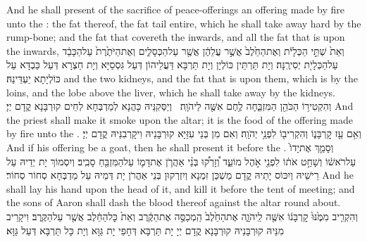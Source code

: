 {And he shall present of the sacrifice of peace-offerings an offering made by fire unto the \lord: the fat thereof, the fat tail entire, which he shall take away hard by the rump-bone; and the fat that covereth the inwards, and all the fat that is upon the inwards,}{}
{וְאֵת֙ שְׁתֵּ֣י הַכְּלָיֹ֔ת וְאֶת\maqqaf הַחֵ֙לֶב֙ אֲשֶׁ֣ר עֲלֵהֶ֔ן אֲשֶׁ֖ר עַל\maqqaf הַכְּסָלִ֑ים וְאֶת\maqqaf הַיֹּתֶ֙רֶת֙ עַל\maqqaf הַכָּבֵ֔ד עַל\maqqaf הַכְּלָיֹ֖ת יְסִירֶֽנָּה׃}
{וְיָת תַּרְתֵּין כּוֹלְיָן וְיָת תַּרְבָּא דַּעֲלֵיהוֹן דְּעַל גִּסְסַיָּא וְיָת חַצְרָא דְּעַל כַּבְדָּא עַל כּוֹלְיָתָא יַעְדֵּינַהּ׃}
{and the two kidneys, and the fat that is upon them, which is by the loins, and the lobe above the liver, which he shall take away by the kidneys.}{}
{וְהִקְטִיר֥וֹ הַכֹּהֵ֖ן הַמִּזְבֵּ֑חָה לֶ֥חֶם אִשֶּׁ֖ה לַיהֹוָֽה׃ \petucha }
{וְיַסְּקִנֵּיהּ כָּהֲנָא לְמַדְבְּחָא לְחֵים קוּרְבָּנָא קֳדָם יְיָ׃}
{And the priest shall make it smoke upon the altar; it is the food of the offering made by fire unto the \lord.}{}
{וְאִ֥ם עֵ֖ז קׇרְבָּנ֑וֹ וְהִקְרִיב֖וֹ לִפְנֵ֥י יְהֹוָֽה׃}
{וְאִם מִן בְּנֵי עִזַּיָּא קוּרְבָּנֵיהּ וִיקָרְבִנֵּיהּ קֳדָם יְיָ׃}
{And if his offering be a goat, then he shall present it before the \lord.}{}
{וְסָמַ֤ךְ אֶת\maqqaf יָדוֹ֙ עַל\maqqaf רֹאשׁ֔וֹ וְשָׁחַ֣ט אֹת֔וֹ לִפְנֵ֖י אֹ֣הֶל מוֹעֵ֑ד וְ֠זָרְק֠וּ בְּנֵ֨י אַהֲרֹ֧ן אֶת\maqqaf דָּמ֛וֹ עַל\maqqaf הַמִּזְבֵּ֖חַ סָבִֽיב׃}
{וְיִסְמוֹךְ יָת יְדֵיהּ עַל רֵישֵׁיהּ וְיִכּוֹס יָתֵיהּ קֳדָם מַשְׁכַּן זִמְנָא וְיִזְרְקוּן בְּנֵי אַהֲרֹן יָת דְּמֵיהּ עַל מַדְבְּחָא סְחוֹר סְחוֹר׃}
{And he shall lay his hand upon the head of it, and kill it before the tent of meeting; and the sons of Aaron shall dash the blood thereof against the altar round about.}{}
{וְהִקְרִ֤יב מִמֶּ֙נּוּ֙ קׇרְבָּנ֔וֹ אִשֶּׁ֖ה לַֽיהֹוָ֑ה אֶת\maqqaf הַחֵ֙לֶב֙ הַֽמְכַסֶּ֣ה אֶת\maqqaf הַקֶּ֔רֶב וְאֵת֙ כׇּל\maqqaf הַחֵ֔לֶב אֲשֶׁ֖ר עַל\maqqaf הַקֶּֽרֶב׃}
{וִיקָרֵיב מִנֵּיהּ קוּרְבָּנֵיהּ קוּרְבָּנָא קֳדָם יְיָ יָת תַּרְבָּא דְּחָפֵי יָת גַּוָּא וְיָת כָּל תַּרְבָּא דְּעַל גַּוָּא׃}

